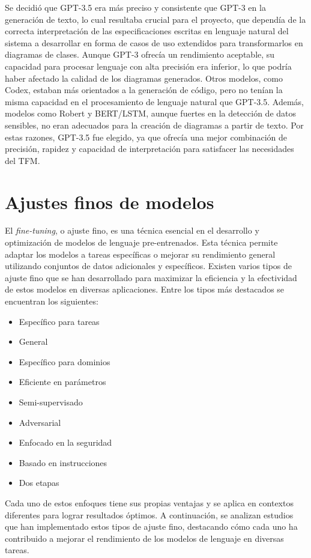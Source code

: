 Se decidió que GPT-3.5 era más preciso y consistente que GPT-3 en la generación de texto, lo cual resultaba crucial para el proyecto, que dependía de la correcta interpretación de las especificaciones escritas en lenguaje natural del sistema a desarrollar en forma de casos de uso extendidos para transformarlos en diagramas de clases. Aunque GPT-3 ofrecía un rendimiento aceptable, su capacidad para procesar lenguaje con alta precisión era inferior, lo que podría haber afectado la calidad de los diagramas generados. Otros modelos, como Codex, estaban más orientados a la generación de código, pero no tenían la misma capacidad en el procesamiento de lenguaje natural que GPT-3.5. Además, modelos como Robert y BERT/LSTM, aunque fuertes en la detección de datos sensibles, no eran adecuados para la creación de diagramas a partir de texto. Por estas razones, GPT-3.5 fue elegido, ya que ofrecía una mejor combinación de precisión, rapidez y capacidad de interpretación para satisfacer las necesidades del TFM.

\section{Ajustes finos de modelos}   

El \textit{fine-tuning}, o ajuste fino, es una técnica esencial en el desarrollo y optimización de modelos de lenguaje pre-entrenados. Esta técnica permite adaptar los modelos a tareas específicas o mejorar su rendimiento general utilizando conjuntos de datos adicionales y específicos. Existen varios tipos de ajuste fino que se han desarrollado para maximizar la eficiencia y la efectividad de estos modelos en diversas aplicaciones. Entre los tipos más destacados se encuentran los siguientes: 

\begin{itemize}
	\item Específico para tareas
	\item General
	\item Específico para dominios
	\item Eficiente en parámetros
	\item Semi-supervisado
	\item Adversarial
	\item Enfocado en la seguridad
	\item Basado en instrucciones
	\item Dos etapas
\end{itemize}

Cada uno de estos enfoques tiene sus propias ventajas y se aplica en contextos diferentes para lograr resultados óptimos. A continuación, se analizan estudios que han implementado estos tipos de ajuste fino, destacando cómo cada uno ha contribuido a mejorar el rendimiento de los modelos de lenguaje en diversas tareas.

